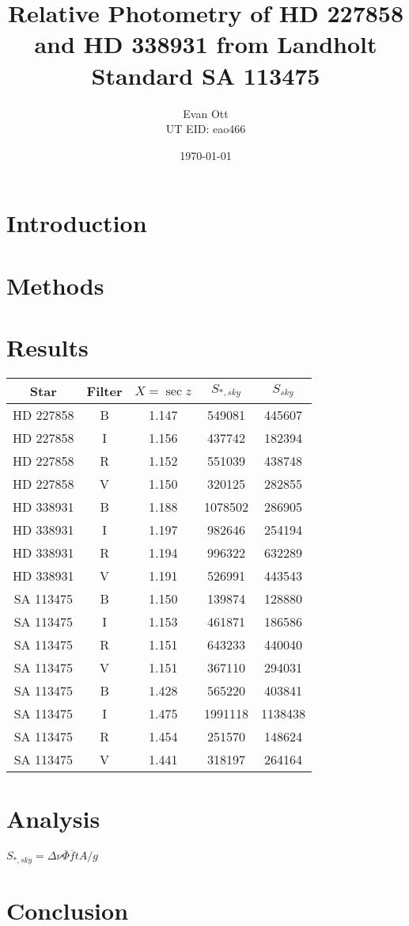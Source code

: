 \documentclass{article}
\title{Relative Photometry of HD 227858 and HD 338931 from Landholt Standard SA 113475}
\author{Evan Ott \\ UT EID: eao466}
\date{\today}
\newcommand{\obar}[1]{\ensuremath{\overline{ #1 }}}
\begin{document}
\maketitle
\section{Introduction}





\section{Methods}








\section{Results}


\begin{tabular}{c | c | c | c | c}
Star & Filter & $X=\sec{z}$ & $S_{*,sky}$ & $S_{sky}$ \\
\hline
HD 227858 & B & 1.147 & 549081 & 445607 \\
HD 227858 & I & 1.156 & 437742 &  182394\\
HD 227858 & R & 1.152 & 551039 & 438748\\
HD 227858 & V & 1.150 & 320125 & 282855\\
HD 338931 & B & 1.188 & 1078502 & 286905\\
HD 338931 & I & 1.197 & 982646 & 254194\\
HD 338931 & R & 1.194 & 996322 & 632289\\
HD 338931 & V & 1.191 & 526991 & 443543\\
SA 113475 & B & 1.150 & 139874 & 128880\\
SA 113475 & I & 1.153 & 461871 & 186586\\
SA 113475 & R & 1.151 & 643233 & 440040\\
SA 113475 & V & 1.151 & 367110 & 294031\\
SA 113475 & B & 1.428 & 565220 & 403841\\
SA 113475 & I & 1.475 & 1991118 & 1138438\\
SA 113475 & R & 1.454 & 251570 & 148624\\
SA 113475 & V & 1.441 & 318197 & 264164
\end{tabular}

\section{Analysis}
$S_{*,sky}=\Delta\nu{\obar{\Phi}}{\obar{f}}tA/g$





\section{Conclusion}






\begin{thebibliography}{9}

\end{thebibliography}
\end{document}
